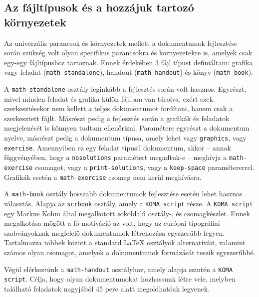 \subsection{Az fájltípusok és a hozzájuk tartozó környezetek}

Az univerzális parancsok és környezetek mellett a dokumentumok fejlesztése
során szükség volt olyan specifikus parancsokra és környezetekre is, amelyek
csak egy-egy fájltípushoz tartoznak. Ennek érdekében 3 fájl típust definiáltam:
grafika vagy feladat (\texttt{math-standalone}), handout (\texttt{math-handout})
és könyv (\texttt{math-book}).

A \texttt{math-standalone} osztály leginkább a fejlesztés során volt hasznos.
Egyrészt, mivel minden feladat és grafika külön fájlban van tárolva, ezért ezek
szerkesztésekor nem kellett a teljes dokumentumot fordítani, hanem csak a
szerkesztett fájlt. Másrészt pedig a fejlesztés során a grafikák és feladatok
megjelenését is könnyen tudtam ellenőrizni. Paramétere egyrészt a dokumentum
nyelve, másrészt pedig a dokumentum típusa, amely lehet vagy \texttt{graphics},
vagy \texttt{exercise}. Amennyiben ez egy feladat típusú dokumentum, akkor --
annak függvényében, hogy a \texttt{nosolutions} paramétert megadtuk-e --
meghívja a \texttt{math-exercise} csomagot, vagy a \texttt{print-solutions},
vagy a \texttt{keep-space} paramétererrel. Grafikák esetén a
\texttt{math-exercise} csomag nem kerül meghívásra.

A \texttt{math-book} osztály hosszabb dokumentumok fejlesztése esetén lehet
hasznos választás. Alapja az \texttt{scrbook} osztály, amely a \texttt{KOMA
	script} része. A \texttt{KOMA script} egy Markus Kohm  által megalkotott
sokoldalú osztály-, és csomagkészlet. Ennek megalkotása mögött a fő motiváció
az volt, hogy az európai tipográfiai szabványoknak megfelelő dokumentumok
létrehozása egyszerűbb legyen. Tartalmazza többek között a standard \LaTeX{}
osztályok alternatíváit, valamint számos olyan csomagot, amelyek a dokumentumok
formázását teszik egyszerűbbé.

Végül elérkeztünk a \texttt{math-handout} osztályhoz, amely alapja szintén
a \texttt{KOMA script}. Célja, hogy olyan dokumentumokat hozhassunk létre vele,
melyben található feladatok nagyjából 45 perc alatt megoldhatóak legyenek.

